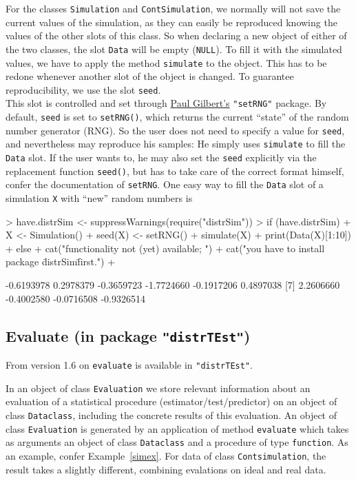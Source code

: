 \documentclass[11pt]{article}
\newcommand{\code}[1]{{\tt #1}}
\newcommand{\pkg}[1]{{\tt "#1"}}
\begin{document}
For the classes \code{Simulation} and \code{ContSimulation}, we normally will
not save the current values of the simulation, as they can easily be reproduced
knowing the values of the other slots of this class.
%
So when declaring a new object of either of the two classes, the slot
\code{Data} will be empty (\code{NULL}).
To fill it with the simulated values, we have to apply the method
\code{simulate} to the object. This has to be redone whenever another slot of
the object is changed.
%
To guarantee reproducibility, we use the slot \code{seed}.\\
%
This slot is controlled and set through
\href{mailto:pgilbert@bank-banque-canada.ca}{Paul Gilbert's} \pkg{setRNG}
package.
By default, \code{seed} is set to \code{setRNG()}, which returns the current
``state'' of the random number generator (RNG). So the user does not need to
specify a value for \code{seed}, and nevertheless may reproduce his samples:
He simply uses \code{simulate} to fill the \code{Data} slot.
If the user wants to, he may also set the \code{seed} explicitly via the
replacement function \code{seed()}, but has to take care of the correct format
himself, confer the documentation of \code{setRNG}. One easy way to fill
the \code{Data} slot of a simulation \code{X} with ``new'' random numbers is
\begin{Schunk}
\begin{Sinput}
> have.distrSim <- suppressWarnings(require("distrSim"))
> if (have.distrSim)
+    {X <- Simulation()
+     seed(X) <- setRNG()
+     simulate(X)
+     print(Data(X)[1:10])
+    } else {
+     cat("\n functionality not (yet) available; ")
+     cat("you have to install package \"distrSim\" first.\n")
+     }
\end{Sinput}
\begin{Soutput}
 [1] -0.6193978  0.2978379 -0.3659723 -1.7724660 -0.1917206  0.4897038
 [7]  2.2606660 -0.4002580 -0.0716508 -0.9326514
\end{Soutput}
\end{Schunk}
%
\subsection[Evaluate (in package distrTEst)]%
{Evaluate (in package \pkg{distrTEst})}\label{evaluate}
%
From version 1.6 on \code{evaluate} is available in  \pkg{distrTEst}.

In an object of class \code{Evaluation}  we store relevant information
about an evaluation of a statistical procedure (estimator/test/predictor)
on an object of class \code{Dataclass}, including the concrete results of
this evaluation. An object of class \code{Evaluation}  is generated by an
application of method \code{evaluate} which takes as arguments an object of
class  \code{Dataclass} and a procedure of type \code{function}. As an example,
confer Example~\ref{simex}.
For data of class \code{Contsimulation}, the result takes a slightly different,
combining evalations on ideal and real data.
%
\end{document}
